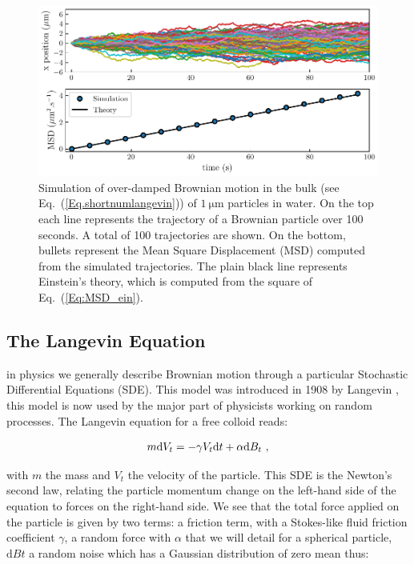 \begin{figure}[!h]
	\centering
	\includegraphics{02_body/chapter1/image/brown_exemple.pdf}
	\caption{Simulation of over-damped Brownian motion in the bulk (see Eq.~(\ref{Eq.shortnumlangevin})) of $1 ~ \mathrm{\mu m}$ particles in water. On the top each line represents the trajectory of a Brownian particle over 100 seconds. A total of 100 trajectories are shown. On the bottom, bullets represent the Mean Square Displacement (\gls{MSD}) computed from the simulated trajectories. The plain black line represents Einstein's theory, which is computed from the square of Eq.~(\ref{Eq:MSD_ein}).\href{https://github.com/eXpensia/Ma-these/blob/main/02_body/chapter1/image/Simple_theory.ipynb}{\faGithub}}
	\label{fig:bulkbrown}
\end{figure}

\subsection{The Langevin Equation}

in physics we generally describe Brownian motion through a particular Stochastic Differential Equations (\gls{SDE}). This model was introduced in 1908 by Langevin \cite{langevin_sur_1908}, this model is now used by the major part of physicists working on random processes. The Langevin equation for a free colloid reads:

\begin{equation}
	m \textnormal{d}V_t  = - \gamma V_t \textnormal{d}t + \alpha \textnormal{d}B_t ~,
	\label{Eq.langevinEquation}
\end{equation}


with $m$ the mass and $V_t$ the velocity of the particle. This \gls{SDE} is the Newton's second law, relating the particle momentum change on the left-hand side of the equation to forces on the right-hand side. We see that the total force applied on the particle is given by two terms: a friction term, with a Stokes-like fluid friction coefficient $\gamma$, a random force with $\alpha$ that we will detail for a spherical particle, $\mathrm{d}Bt$ a random noise which has a Gaussian distribution of zero mean thus:


